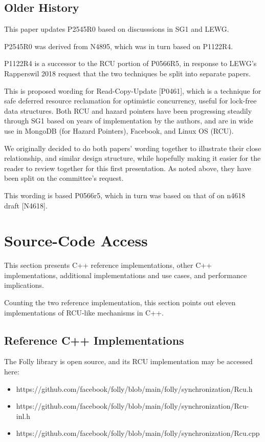 \subsection{Older History}
\label{sec:Older History}

This paper updates P2545R0 based on discusssions in SG1 and LEWG.

P2545R0 was derived from N4895, which was in turn based on P1122R4.

P1122R4 is a successor to the RCU portion of P0566R5, in response to
LEWG’s Rapperswil 2018 request that the two techniques be split into
separate papers.

This is proposed wording for Read-Copy-Update [P0461], which is
a technique for safe deferred resource reclamation for optimistic
concurrency, useful for lock-free data structures.
Both RCU and hazard pointers have been progressing steadily through SG1
based on years of implementation by the authors, and are in wide use in
MongoDB (for Hazard Pointers), Facebook, and Linux OS (RCU).

We originally decided to do both papers' wording together to illustrate
their close relationship, and similar design structure, while hopefully
making it easier for the reader to review together for this first
presentation.
As noted above, they have been split on the committee's request.

This wording is based P0566r5, which in turn was based on that of on
n4618 draft [N4618].

\section{Source-Code Access}
\label{sec:Source-Code Access}

This section presents C++ reference implementations, other
C++ implementations, additional implementations and use cases,
and performance implications.

Counting the two reference implementation, this section points out
eleven implementations of RCU-like mechanisms in C++.

\subsection{Reference C++ Implementations}
\label{sec:Reference C++ Implementations}

The Folly library is open source, and its RCU implementation may be
accessed here:

\begin{itemize}
\item	https://github.com/facebook/folly/blob/main/folly/synchronization/Rcu.h
\item	https://github.com/facebook/folly/blob/main/folly/synchronization/Rcu-inl.h
\item	https://github.com/facebook/folly/blob/main/folly/synchronization/Rcu.cpp
\end{itemize}

